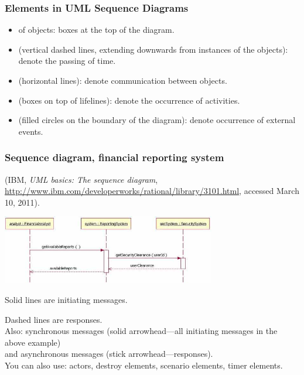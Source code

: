 \begin{frame}
\frametitle{Elements in UML Sequence Diagrams}

\begin{changemargin}{1cm}

\begin{itemize}
\item {} of objects: boxes at the top of the diagram.
\item {} (vertical dashed lines, extending
downwards from instances of the objects): denote the passing of time.
\item {} (horizontal lines): denote 
communication between objects.
\item {} (boxes on top of lifelines): denote
the occurrence of activities.
\item {} (filled circles on the boundary of the diagram):
denote occurrence of external events.
\end{itemize}

\end{changemargin}
\end{frame}

\begin{frame}
\frametitle{Sequence diagram, financial reporting system}

\begin{center}
\scriptsize (IBM, \emph{UML basics: The sequence
  diagram},
\url{http://www.ibm.com/developerworks/rational/library/3101.html},
accessed March 10, 2011).

\includegraphics[width=0.7\textwidth]{images/uml_sequence.png}
\end{center}

\begin{changemargin}{1cm}
Solid lines are initiating messages.

Dashed lines are responses.\\[0.5em]

Also: synchronous messages (solid arrowhead---all initiating
messages in the above example) \\
and asynchronous messages (stick
arrowhead---responses).\\[0.5em]

You can also use: actors, destroy elements, scenario elements, timer elements.
\end{changemargin}

\end{frame}

